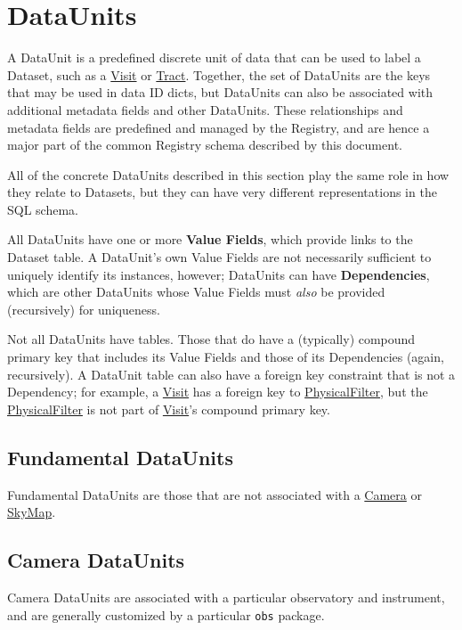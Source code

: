 \documentclass[DM,toc]{lsstdoc}
\newcommand{\unitref}[1]{\hyperref[unit:#1]{#1}}
\newcommand{\unitinc}[1]{}
\begin{document}
\section{DataUnits}
\label{sec:dataunits}

A DataUnit is a predefined discrete unit of data that can be used to label a Dataset, such as a \unitref{Visit} or \unitref{Tract}.
Together, the set of DataUnits are the keys that may be used in data ID dicts, but DataUnits can also be associated with additional metadata fields and other DataUnits.
These relationships and metadata fields are predefined and managed by the Registry, and are hence a major part of the common Registry schema described by this document.

All of the concrete DataUnits described in this section play the same role in how they relate to Datasets, but they can have very different representations in the SQL schema.

All DataUnits have one or more \textbf{Value Fields}, which provide links to the Dataset table.
A DataUnit's own Value Fields are not necessarily sufficient to uniquely identify its instances, however; DataUnits can have \textbf{Dependencies}, which are other DataUnits whose Value Fields must \emph{also} be provided (recursively) for uniqueness.

Not all DataUnits have tables.
Those that do have a (typically) compound primary key that includes its Value Fields and those of its Dependencies (again, recursively).
A DataUnit table can also have a foreign key constraint that is not a Dependency; for example, a \unitref{Visit} has a foreign key to \unitref{PhysicalFilter}, but the \unitref{PhysicalFilter} is not part of \unitref{Visit}'s compound primary key.

\subsection{Fundamental DataUnits}
\label{sec:fundamental-dataunits}

Fundamental DataUnits are those that are not associated with a \unitref{Camera} or \unitref{SkyMap}.

\unitinc{Label}
\unitinc{AbstractFilter}
\unitinc{SkyPix}

\subsection{Camera DataUnits}
\label{sec:camera-dataunits}

Camera DataUnits are associated with a particular observatory and instrument, and are generally customized by a particular \texttt{obs} package.
\end{document}
